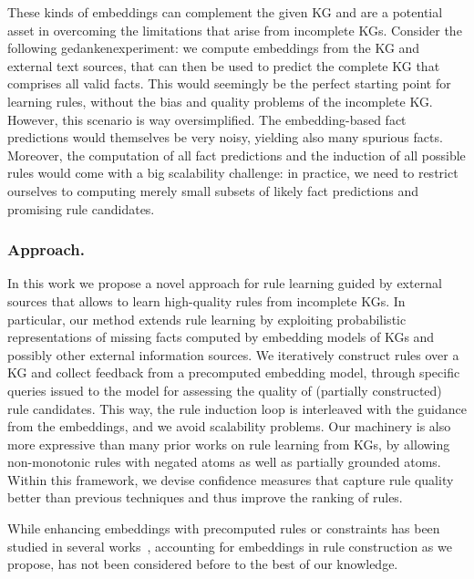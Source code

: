 These kinds of embeddings can complement the given KG and are a potential asset
in overcoming the limitations that arise from incomplete KGs.
Consider the following gedankenexperiment:
we compute embeddings from the KG and external text sources,
that can then be used to predict the complete KG that comprises all valid facts.
This would seemingly be the perfect starting point for learning rules,
without the bias and quality problems of the incomplete KG.
However, this scenario is way oversimplified.
The embedding-based fact predictions would themselves be very noisy,
yielding also many spurious facts.
Moreover, the computation of all fact predictions and the induction of all
possible rules would come with a big scalability challenge: in practice,
we need to restrict ourselves to computing merely 
small subsets of likely fact predictions
and promising rule candidates.




\subsubsection{Approach.}
In this work we propose a novel approach for rule learning guided by external sources
that allows to learn high-quality rules from incomplete KGs.
In particular, our method extends rule learning
by exploiting probabilistic representations of missing facts 
computed by embedding models of KGs and possibly other external information sources. 
We iteratively construct rules over a KG 
and collect feedback from a precomputed embedding model, 
through specific queries issued to the model 
for assessing the quality of (partially constructed) rule candidates. 
This way, the rule induction loop is interleaved with the guidance from the embeddings,
and we avoid scalability problems.
Our machinery is also more expressive than many prior works on rule learning from KGs,
by allowing non-monotonic rules with negated atoms as well as partially grounded atoms. 
Within this framework, we devise confidence measures that capture rule quality
better than previous techniques and thus improve the ranking of rules.

While enhancing embeddings with precomputed rules or constraints has been studied in several works~\cite{Wang2015KnowledgeBC,DBLP:journals/corr/abs-1711-11231,DBLP:conf/sigir/RastogiPD17,DBLP:conf/emnlp/GuoWWWG16,Wang2015KnowledgeBC}, accounting for embeddings in rule construction as we propose, has not been considered before to the best of our knowledge.

